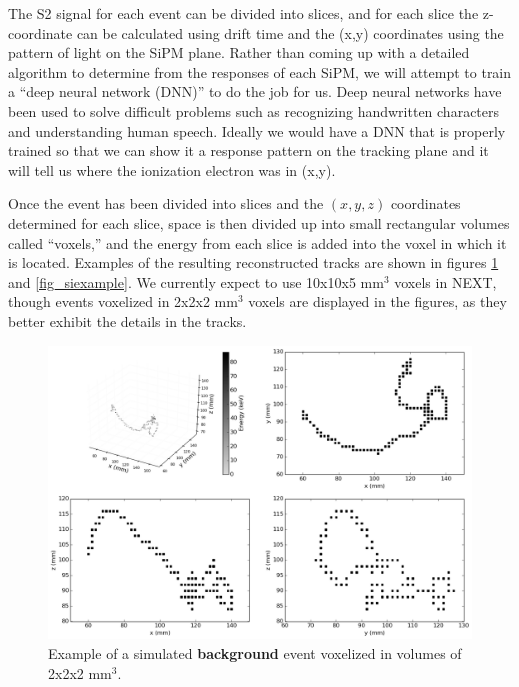 \documentclass[10pt]{article}
\begin{document}
\noindent The S2 signal for each event can be divided into slices, and for each slice the z-coordinate can be calculated using drift time and the (x,y) coordinates using the pattern of light on 
the SiPM plane.  Rather than coming up with a detailed algorithm to determine from the responses of each SiPM, we will attempt to train a ``deep neural network (DNN)'' to do the job for us.  Deep 
neural networks have been used to solve difficult problems such as recognizing handwritten characters and understanding human speech.  Ideally we would have a DNN that is properly trained so
that we can show it a response pattern on the tracking plane and it will tell us where the ionization electron was in (x,y).

\noindent Once the event has been divided into slices and the $(x,y,z)$ coordinates determined for each slice, space is then divided up into small rectangular volumes called ``voxels,'' and the energy from each slice is added into the voxel in which it is located.  Examples of the resulting reconstructed tracks are shown in figures \ref{fig_bgexample} and \ref{fig_siexample}.  
We currently expect to use 10x10x5 mm$^3$ voxels in NEXT, though events voxelized in 2x2x2 mm$^3$ voxels are displayed in the figures, as they better exhibit the details in the tracks.

\begin{figure}[!ht]
	\centering
	\includegraphics[scale=0.4]{fig/plt_dnn3d_NEXT100_Paolina222_v2x2x2_r200x200x200_bg_5.png}
	\caption{\label{fig_bgexample}Example of a simulated \textbf{background} event voxelized in volumes of 2x2x2 mm$^3$.}
\end{figure}
\end{document}
